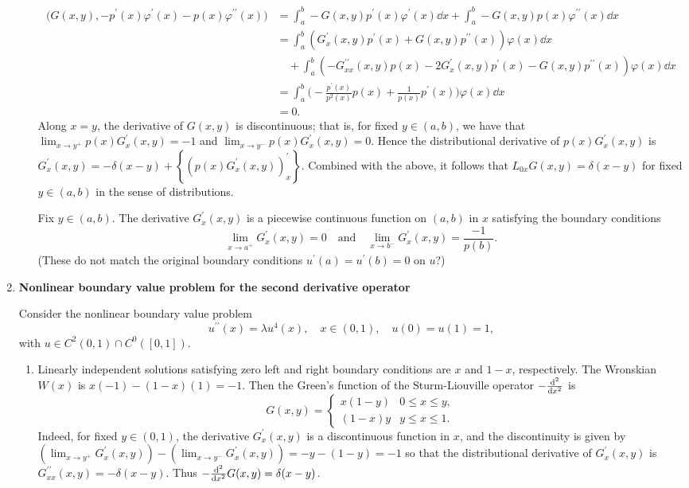 \documentclass[11pt]{article}
\newcommand{\cbr}[1]{\left\{#1\right\}}
\begin{document}
\begin{enumerate}[label=\textbf{\arabic*.}]
\begin{enumerate}[label=\textsf{(\roman*)}]
\begin{align*}
            \bigg(G(x,y), -p^\prime(x)\varphi^\prime(x) - p(x)\varphi^{\prime\prime}(x) \bigg) &= \int_a^b -G(x,y)p^\prime(x)\varphi^\prime(x)\dd x + \int_a^b -G(x,y)p(x)\varphi^{\prime\prime}(x)\dd x\\
            &= \int_a^b (G^\prime_x(x,y)p^\prime(x) + G(x,y)p^{\prime\prime}(x))\varphi(x) \dd x\\&\hspace{1em} + \int_a^b (-G^{\prime\prime}_{xx}(x,y)p(x) - 2G^\prime_x(x,y)p^\prime(x) - G(x,y)p^{\prime\prime}(x))\varphi(x)\dd x\\
            &= \int_a^b \bigg(-\frac{p^\prime(x)}{p^2(x)}p(x) + \frac{1}{p(x)}p^\prime(x)\bigg)\varphi(x)\dd x\\
            &= 0.
        \end{align*}
        Along $x =y$, the derivative of $G(x,y)$ is discontinuous; that is, for fixed $y\in(a,b)$, we have that $\lim_{x\to y^+}p(x)G^\prime_x(x,y) = -1$ and $\lim_{x\to y^-}p(x)G^\prime_x(x,y) = 0$. Hence the distributional derivative of $p(x)G^\prime_x(x,y)$ is $G^\prime_x(x,y) = -\delta(x-y) + \cbr{(p(x)G^\prime_x(x,y))^\prime_x}$. Combined with the above, it follows that $L_{0x}G(x,y) = \delta(x-y)$ for fixed $y\in(a,b)$ in the sense of distributions.

        Fix $y\in (a,b)$. The derivative $G^\prime_x(x,y)$ is a piecewise continuous function on $(a,b)$ in $x$ satisfying the boundary conditions \[\lim_{x\to a^+}G^\prime_x(x,y) = 0 \quad \text{and}\quad \lim_{x\to b^-}G^\prime_x(x,y) = \frac{-1}{p(b)} .\] (These do not match the original boundary conditions $u^\prime(a) = u^\prime(b) = 0$ on $u$?)
    \end{enumerate}
    
    \hrulefill
    \item \textbf{Nonlinear boundary value problem for the second derivative operator}
    
    Consider the nonlinear boundary value problem \[u^{\prime\prime}(x) = \lambda u^4(x),\quad x\in(0,1),\quad u(0) = u(1) = 1,\] with $u\in C^2(0,1)\cap C^0([0,1])$.
    \begin{enumerate}[label=\textsf{(\roman*)}]
        \item Linearly independent solutions satisfying zero left and right boundary conditions are $x$ and $1-x$, respectively. The Wronskian $W(x)$ is $x(-1) - (1-x)(1)=-1$. Then the Green's function of the Sturm-Liouville operator $-\dv[2] x$ is \[G(x,y) = \begin{cases}
            x(1-y) & 0\leq x\leq y,\\
            (1-x)y & y\leq x \leq 1.
        \end{cases}\]
        Indeed, for fixed $y\in (0,1)$, the derivative $G^\prime_x(x,y)$ is a discontinuous function in $x$, and the discontinuity is given by $(\lim_{x\to y^+} G^\prime_x(x,y)) - (\lim_{x\to y^-} G^\prime_x(x,y)) = -y-(1-y) = -1$ so that the distributional derivative of $G^\prime_x(x,y)$ is $G^{\prime\prime}_{xx}(x,y) = -\delta(x-y)$. Thus $-\dv[2] x G(x,y) = \delta(x-y)$.
        

\end{enumerate}
\end{enumerate}
\end{document}
